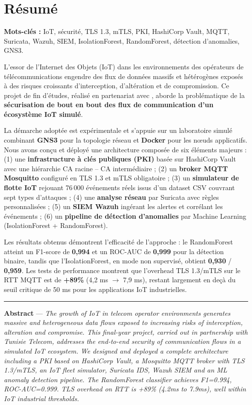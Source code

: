 \chapter*{Résumé}

\textbf{Mots-clés :} IoT, sécurité, TLS 1.3, mTLS, PKI, HashiCorp Vault, MQTT, Suricata, Wazuh, SIEM, IsolationForest, RandomForest, détection d'anomalies, GNS3.

\vspace{0.5cm}

L'essor de l'Internet des Objets (IoT) dans les environnements des opérateurs de télécommunications engendre des flux de données massifs et hétérogènes exposés à des risques croissants d'interception, d'altération et de compromission. Ce projet de fin d'études, réalisé en partenariat avec \TT{}, aborde la problématique de la \textbf{sécurisation de bout en bout des flux de communication d'un écosystème IoT simulé}.

La démarche adoptée est expérimentale et s'appuie sur un laboratoire simulé combinant \textbf{GNS3} pour la topologie réseau et \textbf{Docker} pour les nœuds applicatifs. Nous avons conçu et déployé une architecture composée de six éléments majeurs : (1) une \textbf{infrastructure à clés publiques (PKI)} basée sur HashiCorp Vault avec une hiérarchie CA racine -- CA intermédiaire ; (2) un \textbf{broker MQTT Mosquitto} configuré en TLS 1.3 et mTLS obligatoire ; (3) un \textbf{simulateur de flotte IoT} rejouant 76\,000 événements réels issus d'un dataset CSV couvrant sept types d'attaques ; (4) une \textbf{analyse réseau} par Suricata avec règles personnalisées ; (5) un \textbf{SIEM Wazuh} ingérant les alertes et corrélant les événements ; (6) un \textbf{pipeline de détection d'anomalies} par Machine Learning (IsolationForest + RandomForest).

Les résultats obtenus démontrent l'efficacité de l'approche : le RandomForest atteint un F1-score de \textbf{0,994} et un ROC-AUC de \textbf{0,999} pour la détection binaire, tandis que l'IsolationForest, en mode non supervisé, obtient \textbf{0,930} / \textbf{0,959}. Les tests de performance montrent que l'overhead TLS 1.3/mTLS sur le RTT MQTT est de \textbf{+89\%} (4,2 ms $\to$ 7,9 ms), restant largement en deçà du seuil critique de 50 ms pour les applications IoT industrielles.

\vspace{0.5cm}
\hrule
\vspace{0.3cm}

\textbf{Abstract} — \textit{The growth of IoT in telecom operator environments generates massive and heterogeneous data flows exposed to increasing risks of interception, alteration and compromise. This final-year project, carried out in partnership with Tunisie Telecom, addresses the end-to-end security of communication flows in a simulated IoT ecosystem. We designed and deployed a complete architecture including a PKI based on HashiCorp Vault, a Mosquitto MQTT broker with TLS 1.3/mTLS, an IoT fleet simulator, Suricata IDS, Wazuh SIEM and an ML anomaly detection pipeline. The RandomForest classifier achieves F1=0.994, ROC-AUC=0.999. TLS overhead on RTT is +89\% (4.2ms to 7.9ms), well within IoT industrial thresholds.}

\cleardoublepage
